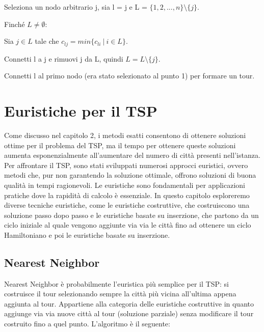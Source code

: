 \documentclass[a4paper,12pt]{report}
\begin{document}
\begin{tcolorbox}[colframe=black,colback=white,boxrule=0.5pt, sharp corners]
\begin{legal}
  \item Seleziona un nodo arbitrario j, sia l = j e L = $\{1, 2, ..., n\} \setminus \{j\}$.
  \item Finché $L \neq \emptyset$:
  \begin{legal}
    \item Sia $j \in L$ tale che $c_{lj} = min\{c_{li} \  | \  i \in L\}$.
    \item Connetti l a j e rimuovi j da L, quindi $ L = L \setminus \{j\} $.
  \end{legal}
  \item Connetti l al primo nodo (era stato selezionato al punto 1) per formare un tour.
\end{legal}
\end{tcolorbox}
\hfill \break

\chapter{Euristiche per il TSP}
Come discusso nel capitolo 2, i metodi esatti consentono di ottenere soluzioni ottime per il problema del TSP, ma il tempo per ottenere queste soluzioni aumenta esponenzialmente all'aumentare del numero di città presenti nell'istanza. Per affrontare il TSP, sono stati sviluppati numerosi approcci euristici, ovvero metodi che, pur non garantendo la soluzione ottimale, offrono soluzioni di buona qualità in tempi ragionevoli. Le euristiche sono fondamentali per applicazioni pratiche dove la rapidità di calcolo è essenziale. In questo capitolo esploreremo diverse tecniche euristiche, come le euristiche costruttive, che costruiscono una soluzione passo dopo passo e le euristiche basate su inserzione, che partono da un ciclo iniziale al quale vengono aggiunte via via le città fino ad ottenere un ciclo Hamiltoniano e poi le euristiche basate su inserzione.
\section{Nearest Neighbor}
Nearest Neighbor è probabilmente l'euristica più semplice per il TSP: si costruisce il tour selezionando sempre la città più vicina all'ultima appena aggiunta al tour. Appartiene alla categoria delle euristiche costruttive in quanto aggiunge via via nuove città al tour (soluzione parziale) senza modificare il tour costruito fino a quel punto. L'algoritmo è il seguente:
\end{document}
